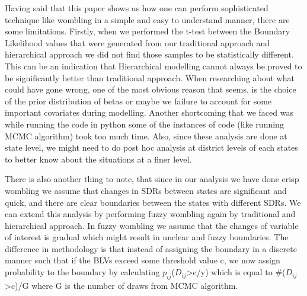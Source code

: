 \documentclass[enabledeprecatedfontcommands,parskip=half,twoside=semi,BCOR=0mm]{scrreprt}
\numberwithin{equation}{chapter}
\theoremstyle{definition}
\theoremstyle{remark}
\begin{document}
    Having said that this paper shows us how one can perform sophisticated technique like wombling in a simple and easy to understand manner, there are some limitations. Firstly, when we performed the t-test between the Boundary Likelihood values that were generated from our traditional approach and hierarchical approach we did not find those samples to be statistically different. This can be an indication that Hierarchical modelling cannot always be proved to be significantly better than traditional approach. When researching about what could have gone wrong, one of the most obvious reason that seems, is the choice of the prior distribution of betas or maybe we failure to account for some important covariates during modelling. Another shortcoming that we faced was while running the code in python some of the instances of code (like running MCMC algorithm) took too much time. Also, since these analysis are done at state level, we might need to do post hoc analysis at district levels of each states to better know about the situations at a finer level. 
    
    There is also another thing to note, that since in our analysis we have done crisp wombling we assume that changes in SDRs between states are significant and quick, and there are clear boundaries between the states with different SDRs. We can extend this analysis by performing fuzzy wombling again by traditional and hierarchical approach. In fuzzy wombling we assume that the changes of variable of interest is gradual which might result in unclear and fuzzy boundaries. The difference in methodology is that instead of assigning the boundary in a discrete manner such that if the BLVs exceed some threshold value c, we now assign probability to the boundary by calculating \(p_{ij}\)(\(D_{ij}\)>c/y) which is equal to \#(\(D_{ij}\)>c)/G where G is the number of draws from MCMC algorithm.
    
    \newpage
    \printbibliography
\end{document}
